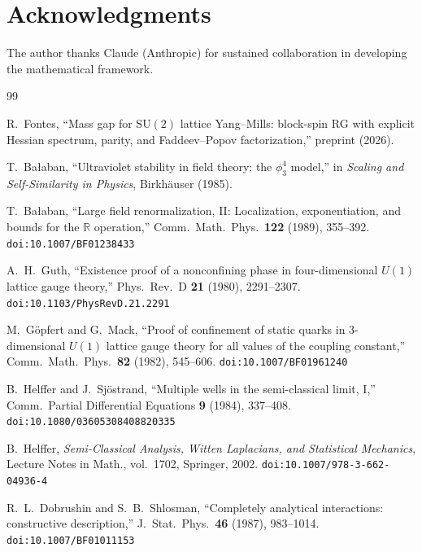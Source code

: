 \documentclass[11pt,a4paper]{article}
\theoremstyle{plain}
\theoremstyle{definition}
\theoremstyle{remark}
\newcommand{\R}{\mathbb{R}}
\newcommand{\SU}{\mathrm{SU}}
\begin{document}
\section*{Acknowledgments}

The author thanks Claude (Anthropic) for sustained
collaboration in developing the mathematical framework.

\begin{thebibliography}{99}

 R.~Fontes,
  ``Mass gap for $\SU(2)$ lattice Yang--Mills:
  block-spin RG with explicit Hessian spectrum,
  parity, and Faddeev--Popov factorization,''
  preprint (2026).

 T.~Ba{\l}aban,
  ``Ultraviolet stability in field theory:
  the $\phi^4_3$ model,''
  in \emph{Scaling and Self-Similarity in Physics},
  Birkh\"auser (1985).

 T.~Ba{\l}aban,
  ``Large field renormalization, II:
  Localization, exponentiation, and bounds for the
  $\R$ operation,''
  Comm.\ Math.\ Phys.\ \textbf{122} (1989), 355--392.
  \texttt{doi:10.1007/BF01238433}

 A.~H.~Guth,
  ``Existence proof of a nonconfining phase in
  four-dimensional $U(1)$ lattice gauge theory,''
  Phys.\ Rev.\ D \textbf{21} (1980), 2291--2307.
  \texttt{doi:10.1103/PhysRevD.21.2291}

 M.~G\"opfert and G.~Mack,
  ``Proof of confinement of static quarks in 3-dimensional
  $U(1)$ lattice gauge theory for all values of the
  coupling constant,''
  Comm.\ Math.\ Phys.\ \textbf{82} (1982), 545--606.
  \texttt{doi:10.1007/BF01961240}

 B.~Helffer and J.~Sj\"ostrand,
  ``Multiple wells in the semi-classical limit, I,''
  Comm.\ Partial Differential Equations \textbf{9}
  (1984), 337--408.
  \texttt{doi:10.1080/03605308408820335}

 B.~Helffer,
  \emph{Semi-Classical Analysis, Witten Laplacians,
  and Statistical Mechanics},
  Lecture Notes in Math., vol.~1702, Springer, 2002.
  \texttt{doi:10.1007/978-3-662-04936-4}

 R.~L.~Dobrushin and
  S.~B.~Shlosman,
  ``Completely analytical interactions:
  constructive description,''
  J.~Stat.\ Phys.\ \textbf{46} (1987), 983--1014.
  \texttt{doi:10.1007/BF01011153}


\end{thebibliography}
\end{document}
